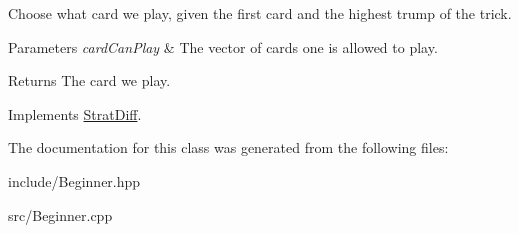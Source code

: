 \-Choose what card we play, given the first card and the highest trump of the trick. 


\begin{DoxyParams}{\-Parameters}
{\em card\-Can\-Play} & \-The vector of cards one is allowed to play. \\
\hline
\end{DoxyParams}
\begin{DoxyReturn}{\-Returns}
\-The card we play. 
\end{DoxyReturn}


\-Implements \hyperlink{classStratDiff_a550903bf95e6a897f346debab972f33a}{\-Strat\-Diff}.



\-The documentation for this class was generated from the following files\-:\begin{DoxyCompactItemize}
\item 
include/\-Beginner.\-hpp\item 
src/\-Beginner.\-cpp\end{DoxyCompactItemize}
